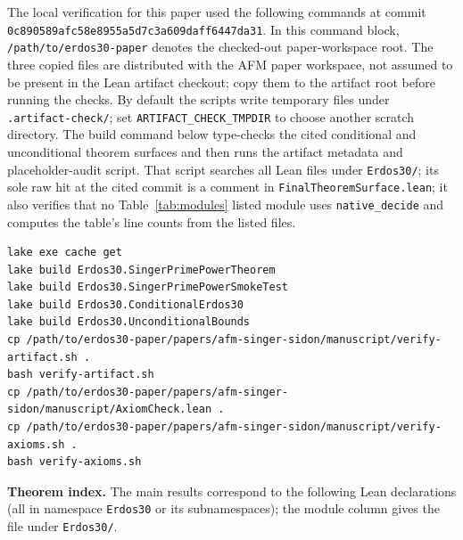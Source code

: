 \documentclass[11pt,a4paper]{article}
\begin{document}
\noindent The local verification for this paper used the following commands at
commit \texttt{0c890589afc58e8955a5d7c3a609daff6447da31}.  In this command block,
\texttt{/path/to/erdos30-paper} denotes the checked-out paper-workspace
root.  The three copied files are distributed with the AFM paper workspace,
not assumed to be present in the Lean artifact checkout; copy them to the
artifact root before running the checks.  By default the scripts write
temporary files under \texttt{.artifact-check/}; set
\texttt{ARTIFACT\_CHECK\_TMPDIR} to choose another scratch directory.  The build command below
type-checks the cited conditional and unconditional theorem surfaces and then
runs the artifact metadata and placeholder-audit script.  That script searches all Lean
files under \texttt{Erdos30/}; its sole raw hit at the cited commit is a comment
in \texttt{FinalTheoremSurface.lean}; it also verifies that no
Table~\ref{tab:modules} listed module uses \texttt{native\_decide} and computes
the table's line counts from the listed files.
\begin{lstlisting}
lake exe cache get
lake build Erdos30.SingerPrimePowerTheorem
lake build Erdos30.SingerPrimePowerSmokeTest
lake build Erdos30.ConditionalErdos30
lake build Erdos30.UnconditionalBounds
cp /path/to/erdos30-paper/papers/afm-singer-sidon/manuscript/verify-artifact.sh .
bash verify-artifact.sh
cp /path/to/erdos30-paper/papers/afm-singer-sidon/manuscript/AxiomCheck.lean .
cp /path/to/erdos30-paper/papers/afm-singer-sidon/manuscript/verify-axioms.sh .
bash verify-axioms.sh
\end{lstlisting}

\clearpage
\smallskip\noindent\textbf{Theorem index.}
The main results correspond to the following Lean declarations
(all in namespace \texttt{Erdos30} or its subnamespaces); the module column gives the file
under \texttt{Erdos30/}.
\end{document}
